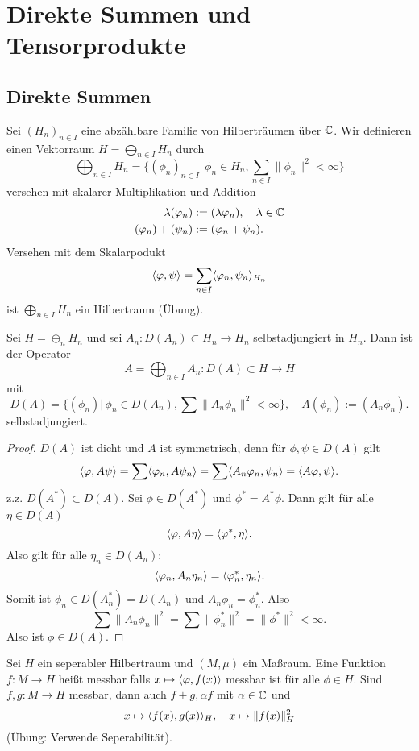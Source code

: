 \documentclass{mycourse}
\begin{document}
\chapter{Direkte Summen und Tensorprodukte}
\section{Direkte Summen}
Sei $(H_n)_{n\in I}$ eine abzählbare Familie von Hilberträumen über $\mathbb{C}$. Wir definieren einen Vektorraum $H= \bigoplus_{n\in I} H_n$ durch
\[
 \bigoplus_{n\in I} H_n = \{(\phi_n)_{n\in I} | \, \phi_n \in H_n, \sum_{n\in I} \| \phi_n\|^2 < \infty\}
\]
versehen mit skalarer Multiplikation und Addition
\begin{align*}
\lambda (\varphi_n) &:= (\lambda \varphi_n), \quad \lambda \in \mathbb{C}\\
(\varphi_n) + (\psi_n) &:= (\varphi_n + \psi_n).
\end{align*}
Versehen mit dem Skalarpodukt
\[
\langle \varphi, \psi\rangle = \sum_{n\in I} \langle \varphi_n, \psi_n\rangle_{H_n}
\]
ist $\bigoplus_{n\in I} H_n$ ein Hilbertraum (Übung).

\begin{st}
Sei $H=\oplus_n H_n$ und sei $A_n: D(A_n) \subset H_n \to H_n$ selbstadjungiert in $H_n$. Dann ist der Operator
\[
A= \bigoplus_{n\in I} A_n: D(A) \subset H \to H
\]
mit
\[
D(A)= \{(\phi_n)|\, \phi_n \in D(A_n), \sum\|A_n \phi_n\|^2 <\infty\}, \quad A(\phi_n):= (A_n \phi_n).
\]
selbstadjungiert.
\end{st}
\begin{proof}
$D(A)$ ist dicht und $A$ ist symmetrisch, denn für $\phi, \psi \in D(A)$ gilt
\[
\langle \varphi, A\psi\rangle = \sum \langle \varphi_n, A\psi_n\rangle = \sum \langle A_n \varphi_n, \psi_n\rangle = \langle A\varphi, \psi\rangle.
\]
z.z. $D(A^*) \subset D(A)$. Sei $\phi \in D(A^*)$ und $\phi^*=A^*\phi$. Dann gilt für alle $\eta\in D(A)$
\[
\langle \varphi, A\eta\rangle = \langle \varphi^*, \eta\rangle.
\]
Also gilt für alle $\eta_n\in D(A_n)$:
\[
\langle \varphi_n, A_n \eta_n\rangle = \langle \varphi_n^*, \eta_n\rangle.
\]
Somit ist $\phi_n \in D(A_n^*) = D(A_n)$ und $A_n \phi_n = \phi_n^*$. Also
\[
\sum \| A_n \phi_n\|^2 = \sum \| \phi_n^* \|^2 = \| \phi^*\|^2 < \infty.
\]
Also ist $\phi \in D(A)$.
\end{proof}

Sei $H$ ein seperabler Hilbertraum und $(M, \mu)$ ein Maßraum. Eine Funktion $f: M \to H$ heißt messbar falls $x\mapsto \langle \varphi, f(x)\rangle$ messbar ist für alle $\phi \in H$. Sind $f,g: M \to H$ messbar, dann auch $f+g, \alpha f$ mit $\alpha \in \mathbb{C}$ und 
\[
x\mapsto \langle f(x), g(x) \rangle_H, \quad x \mapsto \| f(x)\|_H^2
\]
(Übung: Verwende Seperabilität).
\end{document}
